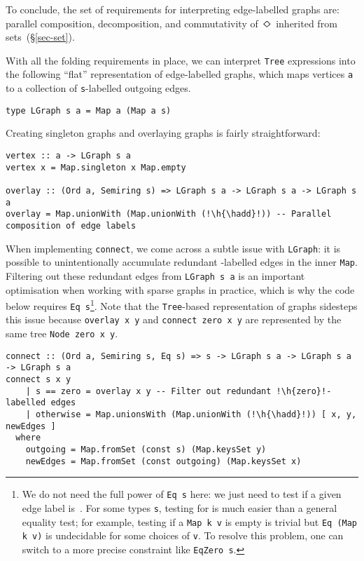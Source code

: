 \documentclass[english,submission]{programming}
\newcommand{\hcode}[1]{{\color{darkblue} \lstinline[keywordstyle={}]|#1|}} %
\newcommand{\h}[1]{{\itshape\color{grayblue}#1}} %
\newcommand{\hadd}{{\large\color{darkblue} $\oplus$}}
\newcommand{\zero}{\raisebox{-0.2mm}{\textcircled{\textsf{0}}}\xspace}
\newcommand{\dia}{\,\text{\raisebox{-0.3mm}{\Large $\diamond$}}\,}
\begin{document}
\noindent
To conclude, the set of requirements for interpreting edge-labelled graphs are:
parallel composition, decomposition, and commutativity of $\dia$ inherited from
sets~(\S\ref{sec-set}).

\newpage
\noindent
With all the folding requirements in place, we can interpret \hcode{Tree}
expressions into the following ``flat'' representation of edge-labelled graphs,
which maps vertices \hcode{a} to a collection of \hcode{s}-labelled outgoing
edges.


\begin{lstlisting}
type LGraph s a = Map a (Map a s)
\end{lstlisting}

\noindent
Creating singleton graphs and overlaying graphs is fairly straightforward:

\begin{lstlisting}
vertex :: a -> LGraph s a
vertex x = Map.singleton x Map.empty

overlay :: (Ord a, Semiring s) => LGraph s a -> LGraph s a -> LGraph s a
overlay = Map.unionWith (Map.unionWith (!\h{\hadd}!)) -- Parallel composition of edge labels
\end{lstlisting}

\noindent
When implementing \hcode{connect}, we come across a subtle issue with
\hcode{LGraph}: it is possible to unintentionally accumulate redundant
\zero-labelled edges in the inner \hcode{Map}. Filtering out these redundant
edges from \hcode{LGraph s a} is an important optimisation when working
with sparse graphs in practice, which is why the code below requires
\hcode{Eq s}\footnote{
    We do not need the full power of \hcode{Eq s} here: we just need to test if
    a given edge label is~\zero. For some types \hcode{s}, testing for \zero is
    much easier than a general equality test; for example, testing if a
    \hcode{Map k v} is empty is trivial but \hcode{Eq (Map k v)} is undecidable
    for some choices of \hcode{v}. To resolve this problem, one can switch to a
    more precise constraint like \hcode{EqZero s}.
}. Note that the \hcode{Tree}-based representation of graphs sidesteps this
issue because \hcode{overlay x y} and \hcode{connect zero x y} are represented
by the same tree \hcode{Node zero x y}.

\begin{lstlisting}
connect :: (Ord a, Semiring s, Eq s) => s -> LGraph s a -> LGraph s a -> LGraph s a
connect s x y
    | s == zero = overlay x y -- Filter out redundant !\h{zero}!-labelled edges
    | otherwise = Map.unionsWith (Map.unionWith (!\h{\hadd}!)) [ x, y, newEdges ]
  where
    outgoing = Map.fromSet (const s) (Map.keysSet y)
    newEdges = Map.fromSet (const outgoing) (Map.keysSet x)
\end{lstlisting}
\end{document}
